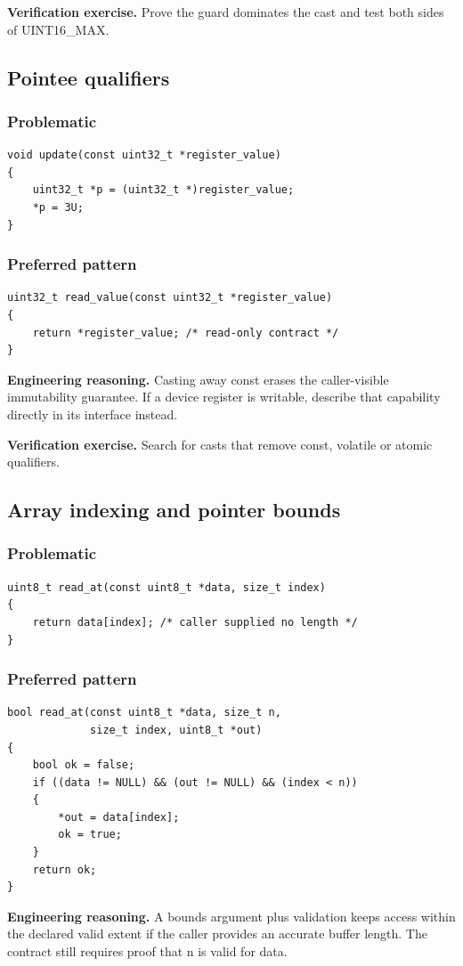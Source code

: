 \documentclass[10pt,letterpaper]{article}
\begin{document}
\textbf{Verification exercise.} Prove the guard dominates the cast and test both sides of UINT16\_MAX.

\subsection{Pointee qualifiers}
\subsubsection*{Problematic}
\begin{lstlisting}[style=engineerc]
void update(const uint32_t *register_value)
{
    uint32_t *p = (uint32_t *)register_value;
    *p = 3U;
}
\end{lstlisting}
\subsubsection*{Preferred pattern}
\begin{lstlisting}[style=engineerc]
uint32_t read_value(const uint32_t *register_value)
{
    return *register_value; /* read-only contract */
}
\end{lstlisting}
\textbf{Engineering reasoning.} Casting away const erases the caller-visible immutability guarantee. If a device register is writable, describe that capability directly in its interface instead.

\textbf{Verification exercise.} Search for casts that remove const, volatile or atomic qualifiers.

\subsection{Array indexing and pointer bounds}
\subsubsection*{Problematic}
\begin{lstlisting}[style=engineerc]
uint8_t read_at(const uint8_t *data, size_t index)
{
    return data[index]; /* caller supplied no length */
}
\end{lstlisting}
\subsubsection*{Preferred pattern}
\begin{lstlisting}[style=engineerc]
bool read_at(const uint8_t *data, size_t n,
             size_t index, uint8_t *out)
{
    bool ok = false;
    if ((data != NULL) && (out != NULL) && (index < n))
    {
        *out = data[index];
        ok = true;
    }
    return ok;
}
\end{lstlisting}
\textbf{Engineering reasoning.} A bounds argument plus validation keeps access within the declared valid extent if the caller provides an accurate buffer length. The contract still requires proof that n is valid for data.
\end{document}
